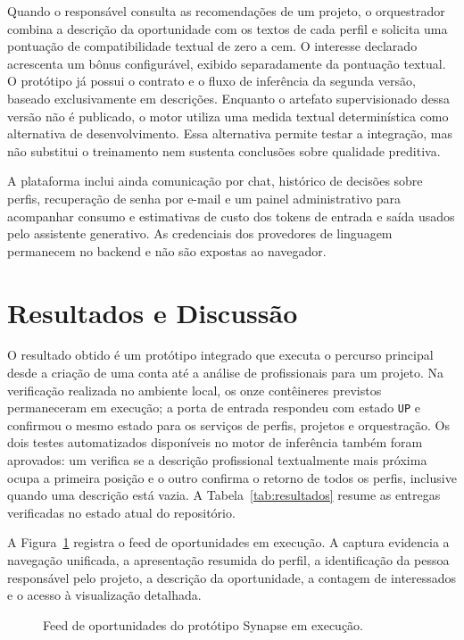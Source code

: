 \documentclass[12pt]{article}
\begin{document}
Quando o responsável consulta as recomendações de um projeto, o orquestrador combina a descrição da oportunidade com os textos de cada perfil e solicita uma pontuação de compatibilidade textual de zero a cem. O interesse declarado acrescenta um bônus configurável, exibido separadamente da pontuação textual. O protótipo já possui o contrato e o fluxo de inferência da segunda versão, baseado exclusivamente em descrições. Enquanto o artefato supervisionado dessa versão não é publicado, o motor utiliza uma medida textual determinística como alternativa de desenvolvimento. Essa alternativa permite testar a integração, mas não substitui o treinamento nem sustenta conclusões sobre qualidade preditiva.

A plataforma inclui ainda comunicação por chat, histórico de decisões sobre perfis, recuperação de senha por e-mail e um painel administrativo para acompanhar consumo e estimativas de custo dos tokens de entrada e saída usados pelo assistente generativo. As credenciais dos provedores de linguagem permanecem no backend e não são expostas ao navegador.

\section{Resultados e Discussão}

O resultado obtido é um protótipo integrado que executa o percurso principal desde a criação de uma conta até a análise de profissionais para um projeto. Na verificação realizada no ambiente local, os onze contêineres previstos permaneceram em execução; a porta de entrada respondeu com estado \texttt{UP} e confirmou o mesmo estado para os serviços de perfis, projetos e orquestração. Os dois testes automatizados disponíveis no motor de inferência também foram aprovados: um verifica se a descrição profissional textualmente mais próxima ocupa a primeira posição e o outro confirma o retorno de todos os perfis, inclusive quando uma descrição está vazia. A Tabela~\ref{tab:resultados} resume as entregas verificadas no estado atual do repositório.

A Figura~\ref{fig:feed} registra o feed de oportunidades em execução. A captura evidencia a navegação unificada, a apresentação resumida do perfil, a identificação da pessoa responsável pelo projeto, a descrição da oportunidade, a contagem de interessados e o acesso à visualização detalhada.

\begin{figure}[ht]
\centering
\caption{Feed de oportunidades do protótipo Synapse em execução.}
\label{fig:feed}
\end{figure}
\end{document}
